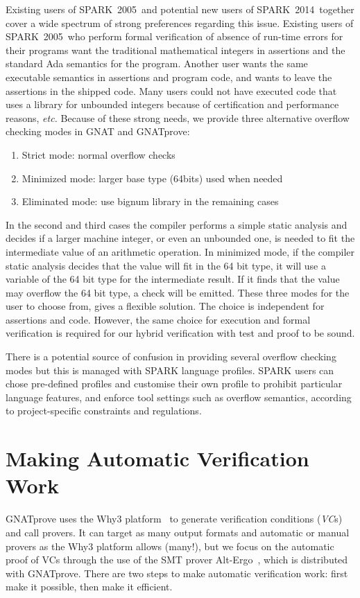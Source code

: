 \documentclass[sttt,final]{svjour}
\newcommand{\gnatprove}{GNATprove\xspace}
\newcommand{\oldspark}{SPARK~2005\xspace}
\newcommand{\newspark}{SPARK~2014\xspace}
\newcommand{\etc}{\textit{etc.}\xspace}
\begin{document}
Existing users of \oldspark\ and potential new users of \newspark\
together cover a wide spectrum of strong preferences regarding this
issue. Existing users of \oldspark\ who perform formal verification of
absence of run-time errors for their programs want the traditional
mathematical integers in assertions and the standard Ada semantics for the
program. Another user wants the same executable semantics in
assertions and program code, and wants to leave the assertions in the
shipped code. Many users could not have executed code that uses a
library for unbounded integers because of certification and
performance reasons, \etc Because of these strong needs, we provide
three alternative overflow checking modes in GNAT and \gnatprove:
\begin{enumerate}
\item Strict mode: normal overflow checks
\item Minimized mode: larger base type (64bits) used when needed
\item Eliminated mode: use bignum library in the remaining cases
\end{enumerate}
In the second and third cases the compiler performs a simple static
analysis and decides if a larger machine integer, or even an unbounded one,
is needed to fit the intermediate value of an arithmetic operation. In
minimized mode, if the compiler static analysis decides that the value will
fit in the 64 bit type, it will use a variable of the 64 bit type for the
intermediate result. If it finds that the value may overflow the 64 bit
type, a check will be emitted. These three modes for the user to choose
from, gives a flexible solution. The choice is independent for assertions
and code. However, the same choice for execution and formal verification is
required for our hybrid verification with test and proof to be sound.

There is a potential source of confusion in providing several overflow
checking modes but this is managed with SPARK language profiles. SPARK
users can chose pre-defined profiles and customise their own profile
to prohibit particular language features, and enforce tool settings
such as overflow semantics, according to project-specific constraints
and regulations.

\section{Making Automatic Verification Work}
\label{automation}

\gnatprove uses the Why3 platform~\cite{why3} to generate verification
conditions (\emph{VC}s) and call provers. It can target as many output
formats and automatic or manual provers as the Why3 platform allows
(many!), but we focus on the automatic proof of VCs through the use of the
SMT prover Alt-Ergo~\cite{altergo}, which is distributed with
\gnatprove. There are two steps to make automatic verification work: first
make it possible, then make it efficient.
\end{document}
